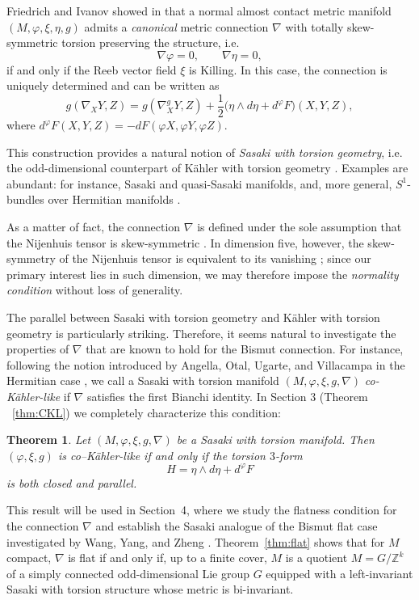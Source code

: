 \documentclass{article}
\newtheorem{thm}{Theorem}[section]
\theoremstyle{definition}
\renewcommand{\phi}{\varphi}
\numberwithin{equation}{section}
\begin{document}
Friedrich and Ivanov showed in  \cite{FI}  that a normal almost contact metric manifold $ (M,\phi,\xi,\eta,g) $ admits a \emph{canonical} metric connection $ \nabla $ with totally skew-symmetric torsion preserving the structure, i.e.  
\[
\nabla \phi = 0, \qquad \nabla \eta = 0,
\]  
if and only if the Reeb vector field $ \xi $ is Killing. In this case, the connection is uniquely determined and can be written as  
\[
g(\nabla_X Y, Z)
= g(\nabla^g_X Y, Z)
+ \frac{1}{2}\bigl(\eta \wedge d\eta + d^\phi F\bigr)(X,Y,Z),
\]  
where $d^\phi F(X,Y,Z) = -dF(\phi X,\phi Y,\phi Z)$. 

This construction provides a natural notion of \emph{Sasaki with torsion geometry}, i.e. the odd-dimensional counterpart of K\"ahler with torsion geometry \cite{IP2}. Examples are abundant: for instance, Sasaki and quasi-Sasaki manifolds, and, more general, $S^1$-bundles over Hermitian manifolds \cite{CoMa}.

As a matter of fact, the connection $\nabla$ is defined under the sole assumption that the Nijenhuis tensor is skew-symmetric \cite{FI}. In dimension five, however, the skew-symmetry of the Nijenhuis tensor is equivalent to its vanishing \cite{CM}; since our primary interest lies in such dimension, we may therefore impose the \emph{normality condition} without loss of generality.
\medskip


The parallel between Sasaki with torsion geometry and K\"ahler with torsion geometry is particularly striking. Therefore, it seems natural to investigate the properties of $\nabla$ that are known to hold for the Bismut connection. For instance, following the notion introduced by Angella, Otal, Ugarte, and Villacampa in the Hermitian case \cite{AOUV}, we call a Sasaki with torsion manifold $(M,\phi,\xi,g,\nabla)$ \emph{co-K\"ahler-like} if $\nabla$ satisfies the first Bianchi identity. In Section 3 (Theorem ~\ref{thm:CKL}) we completely characterize this condition:

\begin{thm} \label{thm:CKL intro}
Let $(M,\phi,\xi,g,\nabla)$ be a Sasaki with torsion manifold. Then $(\phi,\xi,g)$ is co--K\"ahler-like if and only if the torsion $3$-form
\[
H = \eta \wedge d\eta + d^{\phi}F
\]
is both closed and parallel.
\end{thm}



This result will be used in Section~4, where we study the flatness condition for the connection $\nabla$ and establish the Sasaki analogue of the Bismut flat case investigated by Wang, Yang, and Zheng \cite{WYZ}. Theorem~\ref{thm:flat} shows that for $M$ compact, $\nabla$ is flat if and only if, up to a finite cover, $M$ is a quotient $M = G / \mathbb{Z}^k$ of a simply connected odd-dimensional Lie group $G$ equipped with a left-invariant Sasaki with torsion structure whose metric is bi-invariant.
\end{document}
